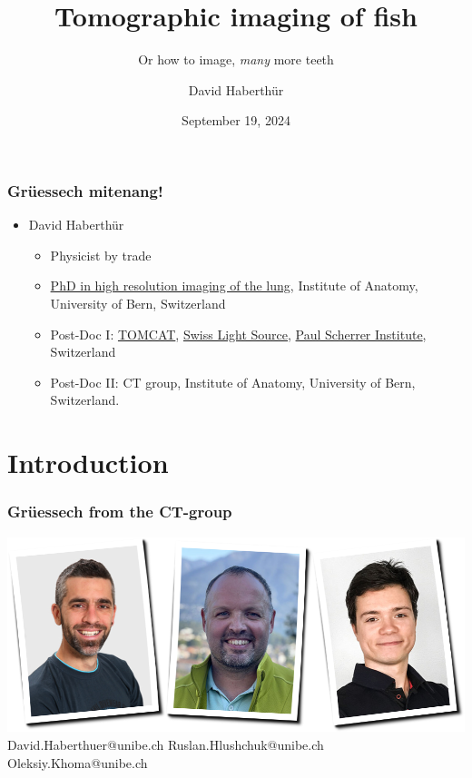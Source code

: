 \documentclass[aspectratio=169,10pt]{beamer}
\title{Tomographic imaging of fish}
\subtitle{Or how to image, \emph{many} more teeth}
\author{David Haberthür}
\institute{Institute of Anatomy}
\date{September 19, 2024}
\newcommand{\imagewidth}{\columnwidth}%
\newcommand{\uct}{{\textmu}CT\xspace}%
\begin{document}
\begin{frame}
	\maketitle
\end{frame}

\begin{frame}
	\frametitle{Grüessech mitenang!}
	\begin{itemize}
		\item David Haberthür
		\begin{itemize}
			\item Physicist by trade
			\item \href{https://boris.unibe.ch/2619/}{PhD in high resolution imaging of the lung}, Institute of Anatomy, University of Bern, Switzerland
			\item Post-Doc I: \href{https://www.psi.ch/sls/tomcat/}{TOMCAT}, \href{https://www.psi.ch/sls/}{Swiss Light Source}, \href{https://www.psi.ch/}{Paul Scherrer Institute}, Switzerland
			\item Post-Doc II: \uct{} group, Institute of Anatomy, University of Bern, Switzerland.
		\end{itemize}
	\end{itemize}
\end{frame}

\section{Introduction}
\begin{frame}
	\frametitle{Grüessech from the \uct-group}
	\centering%
	\includegraphics[width=\imagewidth]{./media/team}%
	\hfill%
	David{\color{ubRed}.}Haberthuer{\color{ubRed}@unibe.ch}%
	\hfill%
	Ruslan{\color{ubRed}.}Hlushchuk{\color{ubRed}@unibe.ch}%
	\hfill%
	Oleksiy{\color{ubRed}.}Khoma{\color{ubRed}@unibe.ch}%
	\hfill%
\end{frame}
\end{document}

